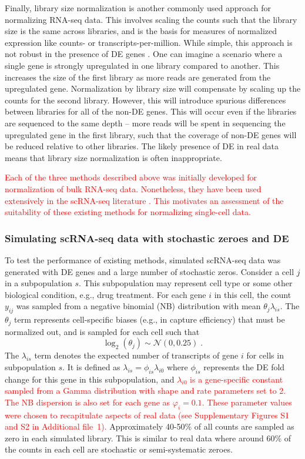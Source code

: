 \documentclass{bmcart}
\newcommand{\suppkleinmeans}{S1}
\newcommand{\suppkleindisp}{S2}
\newcommand{\revised}[1]{\textcolor{red}{#1}}
\begin{document}
Finally, library size normalization is another commonly used approach for normalizing RNA-seq data.
This involves scaling the counts such that the library size is the same across libraries,
    and is the basis for measures of normalized expression like counts- or transcripts-per-million.
While simple, this approach is not robust in the presence of DE genes \cite{robinson2010scaling}.
One can imagine a scenario where a single gene is strongly upregulated in one library compared to another.
This increases the size of the first library as more reads are generated from the upregulated gene.
Normalization by library size will compensate by scaling up the counts for the second library.
However, this will introduce spurious differences between libraries for all of the non-DE genes.
This will occur even if the libraries are sequenced to the same depth 
    -- more reads will be spent in sequencing the upregulated gene in the first library, such that the coverage of non-DE genes will be reduced relative to other libraries.
The likely presence of DE in real data means that library size normalization is often inappropriate.

\revised{Each of the three methods described above was initially developed for normalization of bulk RNA-seq data.
Nonetheless, they have been used extensively in the scRNA-seq literature \cite{saraiva2015hierarchical, kolod2015single, llorens2015singlecell, li2016singlecell, deng2014singlecell, freeman2015singlecell}.
This motivates an assessment of the suitability of these existing methods for normalizing single-cell data.
}

\subsubsection*{Simulating scRNA-seq data with stochastic zeroes and DE}
To test the performance of existing methods, simulated scRNA-seq data was generated with DE genes and a large number of stochastic zeros.
Consider a cell $j$ in a subpopulation $s$.
This subpopulation may represent cell type or some other biological condition, e.g., drug treatment. 
For each gene $i$ in this cell, the count $y_{ij}$ was sampled from a negative binomial (NB) distribution with mean $\theta_{j}\lambda_{is}$.
The $\theta_{j}$ term represents cell-specific biases (e.g., in capture efficiency) that must be normalized out, 
    and is sampled for each cell such that 
\[
\log_2(\theta_j) \sim \mathcal{N}(0, 0.25) \;.
\]
The $\lambda_{is}$ term denotes the expected number of transcripts of gene $i$ for cells in subpopulation $s$.
It is defined as $\lambda_{is}=\phi_{is}\lambda_{i0}$ where $\phi_{is}$ represents the DE fold change for this gene in this subpopulation, and \revised{$\lambda_{i0}$ is a gene-specific constant sampled from a Gamma distribution with shape and rate parameters set to 2.
The NB dispersion is also set for each gene as $\varphi_i = 0.1$.
These parameter values were chosen to recapitulate aspects of real data \cite{klein2015droplet} (see Supplementary Figures \suppkleinmeans{} and \suppkleindisp{} in Additional file~1).}
Approximately 40-50\% of all counts are sampled as zero in each simulated library.
This is similar to real data where around 60\% of the counts in each cell are stochastic or semi-systematic zeroes.
\end{document}
